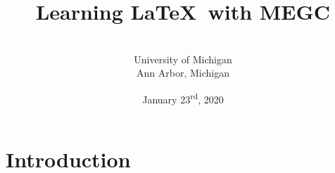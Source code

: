 \documentclass[]{article}%
\theoremstyle{definition}
\begin{document}
	
	
	
	\title{Learning \LaTeX\ with MEGC}
	\author{\vspace{1 in} \\University of Michigan 
		\\Ann Arbor, Michigan \vspace{.25 in} 
	} 
	\date{January 23\textsuperscript{rd}, 2020}
	\maketitle				%
	\thispagestyle{empty} 	%
	\clearpage				%
	
	
	
	\section{Introduction}
	
\end{document}

